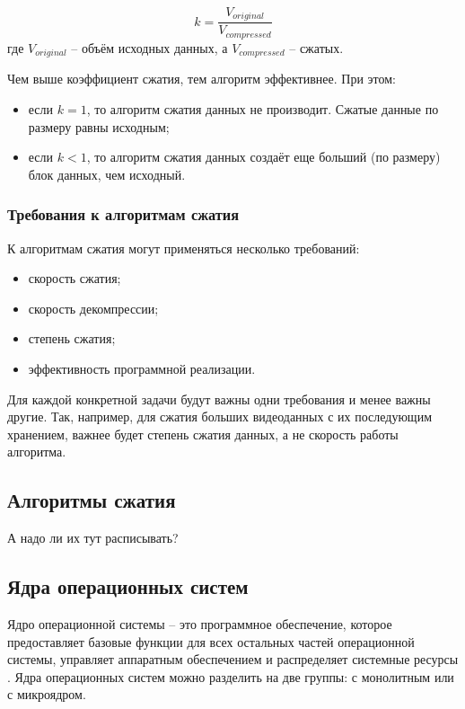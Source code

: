 \begin{equation}\label{fig:memory-compression}
	k = \frac{V_{original}}{V_{compressed}}
\end{equation}
где $V_{original}$ -- объём исходных данных, а $V_{compressed}$ -- сжатых.

Чем выше коэффициент сжатия, тем алгоритм эффективнее. При этом:

\begin{itemize}
	\item если $k = 1$, то алгоритм сжатия данных не производит. Сжатые данные по размеру равны исходным;
	\item если $k < 1$, то алгоритм сжатия данных создаёт еще больший (по размеру) блок данных, чем исходный.
\end{itemize}

\subsubsection{Требования к алгоритмам сжатия}

К алгоритмам сжатия могут применяться несколько требований:

\begin{itemize}
	\item скорость сжатия;
	\item скорость декомпрессии;
	\item степень сжатия;
	\item эффективность программной реализации.
\end{itemize}

Для каждой конкретной задачи будут важны одни требования и менее важны другие. Так, например, для сжатия больших видеоданных с их последующим хранением, важнее будет степень сжатия данных, а не скорость работы алгоритма.

\subsection{Алгоритмы сжатия}

А надо ли их тут расписывать?

\subsection{Ядра операционных систем}

Ядро операционной системы -- это программное обеспечение, которое предоставляет базовые функции для всех остальных частей операционной системы, управляет аппаратным обеспечением и распределяет системные ресурсы \cite{kernel-development}. Ядра операционных систем можно разделить на две группы: с монолитным или с микроядром. 

